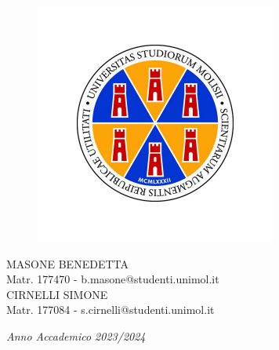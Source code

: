 \documentclass[11pt]{article}
\begin{document}
\begin{center}
	\begin{figure}[h]
		\centering
		\includegraphics[scale = 0.5]{Immagini/unimol_logo.jpg}
	\end{figure}
	\vspace{2cm}
	{\normalsize MASONE BENEDETTA \\ Matr. 177470 - b.masone@studenti.unimol.it\\ }
    \vspace{1em}
	{\normalsize CIRNELLI SIMONE\\ Matr. 177084 - s.cirnelli@studenti.unimol.it\\}
    \vspace{1em}
	\vspace{1em}
\end{center}

\vspace{0.05cm}
\begin{center}
	\large{\emph{Anno Accademico 2023/2024}}
\end{center}

\thispagestyle{empty}

\newpage

    





 
\end{document}
